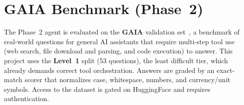 \documentclass[a4paper,12pt]{report}
\begin{document}
\section{GAIA Benchmark (Phase~2)}

The Phase~2 agent is evaluated on the \textbf{GAIA} validation set~\cite{gaia}, a benchmark of real-world questions for general AI assistants that require multi-step tool use (web search, file download and parsing, and code execution) to answer. This project uses the \textbf{Level~1} split (53 questions), the least difficult tier, which already demands correct tool orchestration. Answers are graded by an exact-match scorer that normalizes case, whitespace, numbers, and currency/unit symbols. Access to the dataset is gated on HuggingFace and requires authentication.
\end{document}
